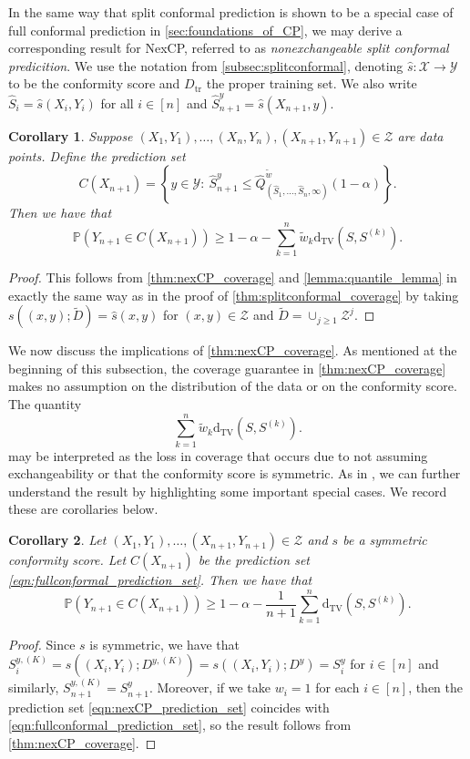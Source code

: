 \documentclass[11pt, titlepage]{article} %
\newcommand{\R}{\mathrm}
\newcommand{\Prob}[1]{\mathbb{P}\left( #1 \right)}
\numberwithin{equation}{section}
\newtheorem{corollary}{Corollary}
\theoremstyle{definition}
\numberwithin{theorem}{section}
\numberwithin{lemma}{section}
\numberwithin{corollary}{section}
\numberwithin{proposition}{section}
\numberwithin{definition}{section}
\numberwithin{remark}{section}
\begin{document}
\noindent
In the same way that split conformal prediction is shown to be a special case of full conformal prediction in \cref{sec:foundations_of_CP}, we may derive a corresponding result for NexCP, referred to as \textit{nonexchangeable split conformal predicition}. We use the notation from \cref{subsec:splitconformal}, denoting \(\hat{s}:\mathcal{X} \to \mathcal{Y}\) to be the conformity score and \(D_\R{tr}\) the proper training set. We also write \(\hat{S}_i = \hat{s}(X_i, Y_i)\) for all \(i \in [n]\) and \(\hat{S}_{n+1}^y = \hat{s}(X_{n+1}, y)\).

\begin{corollary}
    Suppose \((X_1, Y_1), \ldots, (X_n, Y_n), (X_{n+1}, Y_{n+1}) \in \mathcal{Z}\) are data points. Define the prediction set \[
        C(X_{n+1}) = \left\{ y \in \mathcal{Y}: \  \hat{S}_{n+1}^y \leq \hat{Q}^{\tilde{w}}_{(\hat{S}_1, \ldots, \hat{S}_n, \infty)}(1-\alpha)  \right\}.
    \] Then we have that \[\Prob{Y_{n+1} \in C(X_{n+1})}  \geq 1-\alpha - \sum_{k=1}^n \tilde{w}_k \R{d_{TV}}(S, S^{(k)}).\]
\label{corr:nexCP_split}
\end{corollary}
\begin{proof}
    This follows from \cref{thm:nexCP_coverage} and \cref{lemma:quantile_lemma} in exactly the same way as in the proof of \cref{thm:splitconformal_coverage} by taking \(s((x,y); \tilde{D}) = \hat{s}(x,y)\) for \((x,y) \in \mathcal{Z}\) and \(\tilde{D} = \cup_{j \geq 1} \mathcal{Z}^j.\)
\end{proof}

\noindent
We now discuss the implications of \cref{thm:nexCP_coverage}. As mentioned at the beginning of this subsection, the coverage guarantee in \cref{thm:nexCP_coverage} makes no assumption on the distribution of the data or on the conformity score. The quantity \[
    \sum_{k=1}^{n} \tilde{w}_k \R{d_{TV}}(S, S^{(k)}).
\] may be interpreted as the loss in coverage that occurs due to not assuming exchangeability or that the conformity score is symmetric. As in \cite{barber2023conformalbeyondexch}, we can further understand the result by highlighting some important special cases. We record these are corollaries below.

\begin{corollary}
    Let \((X_1, Y_1), \ldots, (X_{n+1}, Y_{n+1}) \in \mathcal{Z}\) and \(s\) be a symmetric conformity score. Let \(C(X_{n+1})\) be the prediction set \eqref{eqn:fullconformal_prediction_set}. Then we have that \[
        \Prob{Y_{n+1} \in C(X_{n+1})}  \geq 1-\alpha - \frac{1}{n+1} \sum_{k=1}^{n} \R{d_{TV}}(S, S^{(k)}).
    \]
\label{corr:nexCP_robustness}
\end{corollary}
\begin{proof}
    Since \(s\) is symmetric, we have that \(S_{i}^{y, (K)} = s((X_i, Y_i); D^{y, (K)}) = s((X_i, Y_i); D^{y}) = S_i^y\) for \(i \in [n]\) and similarly, \(S_{n+1}^{y, (K)} = S_{n+1}^y\). Moreover, if we take \(w_i = 1\) for each \(i \in [n]\), then the prediction set \eqref{eqn:nexCP_prediction_set} coincides with \eqref{eqn:fullconformal_prediction_set}, so the result follows from \cref{thm:nexCP_coverage}.
\end{proof}
\end{document}
